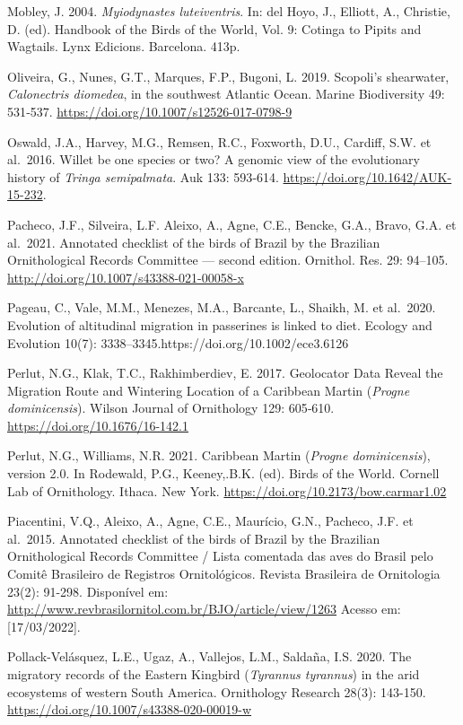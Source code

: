 \documentclass[
  oneside]{scrbook}
\begin{document}
Mobley, J. 2004. \emph{Myiodynastes luteiventris}. In: del Hoyo, J., Elliott, A., Christie, D. (ed). Handbook of the Birds of the World, Vol. 9: Cotinga to Pipits and Wagtails. Lynx Edicions. Barcelona. 413p.

Oliveira, G., Nunes, G.T., Marques, F.P., Bugoni, L. 2019. Scopoli's shearwater, \emph{Calonectris diomedea}, in the southwest Atlantic Ocean. Marine Biodiversity 49: 531‑537. \url{https://doi.org/10.1007/s12526-017-0798-9}

Oswald, J.A., Harvey, M.G., Remsen, R.C., Foxworth, D.U., Cardiff, S.W. et al.~2016. Willet be one species or two? A genomic view of the evolutionary history of \emph{Tringa semipalmata}. Auk 133: 593‑614. \url{https://doi.org/10.1642/AUK-15-232}.

Pacheco, J.F., Silveira, L.F. Aleixo, A., Agne, C.E., Bencke, G.A., Bravo, G.A. et al.~2021. Annotated checklist of the birds of Brazil by the Brazilian Ornithological Records Committee --- second edition. Ornithol. Res. 29: 94--105. \url{http://doi.org/10.1007/s43388-021-00058-x}

Pageau, C., Vale, M.M., Menezes, M.A., Barcante, L., Shaikh, M. et al.~2020. Evolution of altitudinal migration in passerines is linked to diet. Ecology and Evolution 10(7): 3338--3345.https://doi.org/10.1002/ece3.6126

Perlut, N.G., Klak, T.C., Rakhimberdiev, E. 2017. Geolocator Data Reveal the Migration Route and Wintering Location of a Caribbean Martin (\emph{Progne dominicensis}). Wilson Journal of Ornithology 129: 605‑610. \url{https://doi.org/10.1676/16-142.1}

Perlut, N.G., Williams, N.R. 2021. Caribbean Martin (\emph{Progne dominicensis}), version 2.0. In Rodewald, P.G., Keeney,.B.K. (ed). Birds of the World. Cornell Lab of Ornithology. Ithaca. New York. \url{https://doi.org/10.2173/bow.carmar1.02}

Piacentini, V.Q., Aleixo, A., Agne, C.E., Maurício, G.N., Pacheco, J.F. et al.~2015. Annotated checklist of the birds of Brazil by the Brazilian Ornithological Records Committee / Lista comentada das aves do Brasil pelo Comitê Brasileiro de Registros Ornitológicos. Revista Brasileira de Ornitologia 23(2): 91-298. Disponível em: \url{http://www.revbrasilornitol.com.br/BJO/article/view/1263} Acesso em: {[}17/03/2022{]}.

Pollack-Velásquez, L.E., Ugaz, A., Vallejos, L.M., Saldaña, I.S. 2020. The migratory records of the Eastern Kingbird (\emph{Tyrannus tyrannus}) in the arid ecosystems of western South America. Ornithology Research 28(3): 143-150. \url{https://doi.org/10.1007/s43388-020-00019-w}
\end{document}
